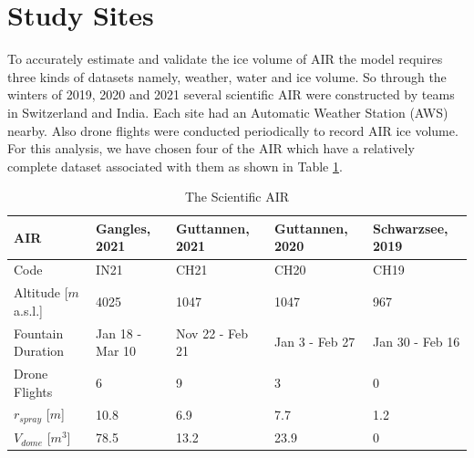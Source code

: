 \documentclass[utf8]{frontiersSCNS} %
\begin{document}
\section{Study Sites}
To accurately estimate and validate the ice volume of AIR the model requires three kinds of datasets namely, weather, water and
ice volume. So through the winters of 2019, 2020 and 2021 several scientific AIR were constructed by teams in Switzerland and
India. Each site had an Automatic Weather Station (AWS) nearby. Also drone flights were conducted periodically to record
AIR ice volume. For this analysis, we have chosen four of the AIR which have a relatively complete dataset associated
with them as shown in Table \ref{table:4AIR}.

\begin{table}[]
\centering
\caption{The Scientific AIR}
\label{table:4AIR}
\begin{tabular}{@{}|l|l|l|l|l|@{}}
\toprule
\textbf{AIR}      & \textbf{Gangles, 2021} & \textbf{Guttannen, 2021} & \textbf{Guttannen, 2020} & \textbf{Schwarzsee, 2019} \\ \midrule
Code                      & IN21 & CH21 & CH20 & CH19 \\ \midrule
Altitude {[}$m$ a.s.l.{]} & 4025 & 1047 & 1047 & 967  \\ \midrule
Fountain Duration & Jan 18 - Mar 10        & Nov 22 - Feb 21          & Jan 3 - Feb 27           & Jan 30 - Feb 16           \\ \midrule
Drone Flights             & 6    & 9    & 3    & 0    \\ \midrule
$r_{spray}$ {[}$m${]}     & 10.8 & 6.9  & 7.7  & 1.2  \\ \midrule
$V_{dome}$ {[}$m^{3}${]}  & 78.5 & 13.2 & 23.9 & 0    \\ \bottomrule
\end{tabular}
\end{table}

\end{document}
